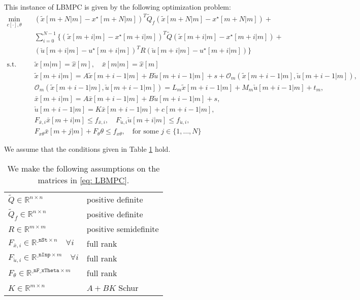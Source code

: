\documentclass[letter]{article}
\begin{document}
\begin{sffamily}
\noindent
This instance of LBMPC is given by the following optimization problem:
\begin{align}\label{eq: LBMPC}
	\min_{c[\cdot],\theta} \quad & (\tilde{x}[m+N|m]-x^\star[m+N|m])^T \tilde{Q}_f (\tilde{x}[m+N|m]-x^\star[m+N|m]) + \\
	&  \sum_{i=0} ^ {N-1} \{ (\tilde{x}[m+i|m]-x^\star[m+i|m])^T \tilde{Q} (\tilde{x}[m+i|m]-x^\star[m+i|m]) + \nonumber \\
	& (\check{u}[m+i|m]-u^\star[m+i|m])^T R (\check{u}[m+i|m]-u^\star[m+i|m]) \}  \nonumber \\	
		\nonumber \\		
	\text{s.t.} \quad & \tilde{x}[m|m] = \hat{x}[m],\quad \bar{x}[m|m] = \hat{x}[m] \nonumber \\
		&  \tilde{x}[m+i|m]= A \tilde{x}[m+i-1|m] + B \check{u}[m+i-1|m] + s + \mathcal{O}_m(\tilde{x}[m+i-1|m],\check{u}[m+i-1|m]), \nonumber\\
		& \mathcal{O}_m(\tilde{x}[m+i-1|m],\check{u}[m+i-1|m]) = L_m \tilde{x}[m+i-1|m] + M_m \check{u}[m+i-1|m] + t_m,  \nonumber \\
	 &	\bar{x}[m+i|m]= A \bar{x}[m+i-1|m] + B \check{u}[m+i-1|m]+s, \nonumber\\
	 & \check{u}[m+i-1|m] = K\bar{x}[m+i-1|m] + c[m+i-1|m], \nonumber \\
	 & F_{\bar{x},i}\bar{x}[m+i|m] \leq f_{\bar{x},i}, \quad F_{\check{u},i}\check{u}[m+i|m] \leq f_{\check{u},i}, \nonumber \\
	 & F_{x\theta}\bar{x}[m+j|m] + F_\theta \theta \leq f_{x\theta},\quad \text{for some } j\in\{1,\ldots, N\} \nonumber
\end{align}

\noindent
We assume that the conditions given in Table \ref{tab: matrix assumptions} hold. \\

\begin{table}[!htdp]
\caption{We make the following assumptions on the matrices in \eqref{eq: LBMPC}.}
\begin{center}
\begin{tabular}{|l|l|}\hline
 $\tilde{Q}\in\mathbb{R}^{n\times n}$ & positive definite\\ 
 $\tilde{Q}_f\in\mathbb{R}^{n\times n}$ & positive definite\\ 
 $R\in\mathbb{R}^{m\times m}$ & positive semidefinite \\ \hline
 $F_{\bar{x},i}\in\mathbb{R}^{\texttt{\_nSt}\times n}\quad \forall i$ & full rank \\ 
 $F_{\check{u},i}\in\mathbb{R}^{\texttt{\_nInp}\times m}\quad \forall i$ & full rank \\ 
 $F_\theta\in\mathbb{R}^{\texttt{\_nF\_xTheta}\times m}$ & full rank \\ \hline
 $K\in\mathbb{R}^{m\times n}$ & $A+BK$ Schur \\ \hline
\end{tabular}
\end{center}
\label{tab: matrix assumptions}
\end{table}



\end{sffamily}
\end{document}
